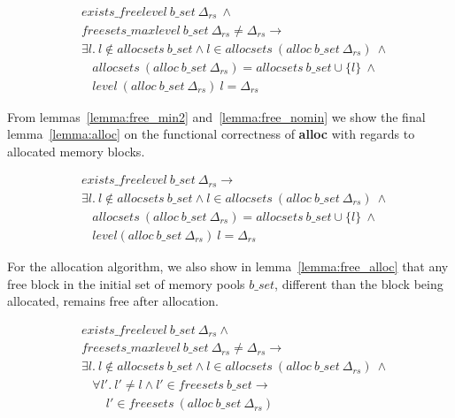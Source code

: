 \begin{lemma} 
\label{lemma:free_nomin}
\end{lemma}
\vspace{-7pt}
\begin{align*}
&exists\_freelevel\ b\_set\ \Delta_{rs}\ \wedge\\
&freesets\_maxlevel\ b\_set\ \Delta_{rs} \neq \Delta_{rs} \longrightarrow\\
&\exists l.\ l \notin allocsets\ b\_set \wedge l \in allocsets\ (alloc\ b\_set\ \Delta_{rs})\ \wedge\\
&\ \ \ \ allocsets\ (alloc\ b\_set\ \Delta_{rs}) = allocsets\ b\_set \cup \lbrace l \rbrace\ \wedge\\
&\ \ \ \ level\ (alloc\ b\_set\ \Delta_{rs})\ l = \Delta_{rs}
\end{align*}
\vspace{-12pt}

From lemmas~\ref{lemma:free_min2} and~\ref{lemma:free_nomin} we show the final lemma~\ref{lemma:alloc} on the functional correctness of \textbf{alloc} with regards to allocated memory blocks.

\begin{lemma} 
\label{lemma:alloc}
\end{lemma}
\vspace{-7pt}
\begin{align*}
&exists\_freelevel\ b\_set\  \Delta_{rs} \longrightarrow \\
&\exists l.\ l \notin allocsets\ b\_set \wedge l \in allocsets\ (alloc\ b\_set\  \Delta_{rs})\ \wedge\\
&\ \ \ \ allocsets\ (alloc\ b\_set\  \Delta_{rs}) = allocsets\ b\_set \cup \lbrace l \rbrace\ \wedge\\
&\ \ \ \ level (alloc\ b\_set\ \Delta_{rs})\ l = \Delta_{rs}
\end{align*}
\vspace{-12pt}

For the allocation algorithm, we also show in lemma~\ref{lemma:free_alloc} that any free block in the initial set of memory pools $b\_set$, different than the block being allocated, remains free after allocation.

\begin{lemma} 
\label{lemma:free_alloc}
\end{lemma}
\vspace{-7pt}
\begin{align*}
&exists\_freelevel\ b\_set\ \Delta_{rs} \wedge\\
&freesets\_maxlevel\ b\_set\ \Delta_{rs} \neq \Delta_{rs} \longrightarrow\\
&\exists l.\ l \notin allocsets\ b\_set \wedge l \in allocsets\ (alloc\ b\_set\ \Delta_{rs})\ \wedge\\
&\ \ \ \ \forall l'.\ l' \neq l \wedge l' \in freesets\ b\_set \longrightarrow\\
&\ \ \ \ \ \ \ \ \ l' \in freesets\ (alloc\ b\_set\ \Delta_{rs}) 
\end{align*}


